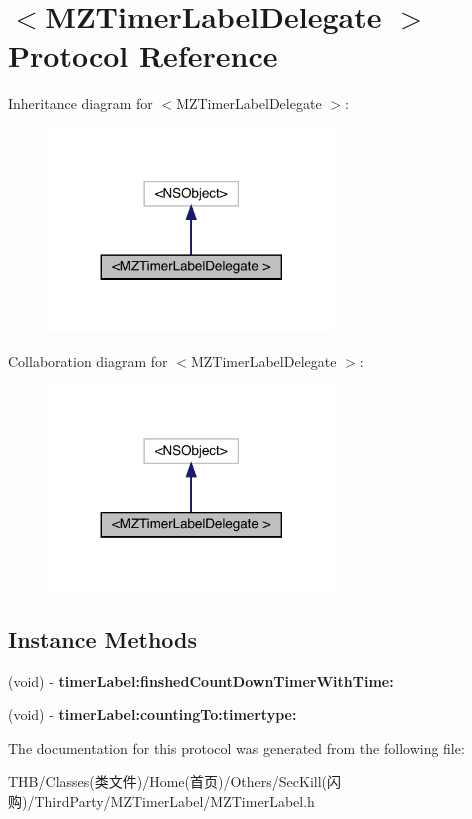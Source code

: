\hypertarget{protocol_m_z_timer_label_delegate_01-p}{}\section{$<$M\+Z\+Timer\+Label\+Delegate $>$ Protocol Reference}
\label{protocol_m_z_timer_label_delegate_01-p}


Inheritance diagram for $<$M\+Z\+Timer\+Label\+Delegate $>$\+:\nopagebreak
\begin{figure}[H]
\begin{center}
\leavevmode
\includegraphics[width=215pt]{protocol_m_z_timer_label_delegate_01-p__inherit__graph}
\end{center}
\end{figure}


Collaboration diagram for $<$M\+Z\+Timer\+Label\+Delegate $>$\+:\nopagebreak
\begin{figure}[H]
\begin{center}
\leavevmode
\includegraphics[width=215pt]{protocol_m_z_timer_label_delegate_01-p__coll__graph}
\end{center}
\end{figure}
\subsection*{Instance Methods}
\begin{DoxyCompactItemize}
\item 
\mbox{\label{protocol_m_z_timer_label_delegate_01-p_a67a9c4e353b3c14639593dc9f630212b}} 
(void) -\/ {\bfseries timer\+Label\+:finshed\+Count\+Down\+Timer\+With\+Time\+:}
\item 
\mbox{\label{protocol_m_z_timer_label_delegate_01-p_a0cfc6076f2705e08c403e90d1baf2ba4}} 
(void) -\/ {\bfseries timer\+Label\+:counting\+To\+:timertype\+:}
\end{DoxyCompactItemize}


The documentation for this protocol was generated from the following file\+:\begin{DoxyCompactItemize}
\item 
T\+H\+B/\+Classes(类文件)/\+Home(首页)/\+Others/\+Sec\+Kill(闪购)/\+Third\+Party/\+M\+Z\+Timer\+Label/M\+Z\+Timer\+Label.\+h\end{DoxyCompactItemize}

